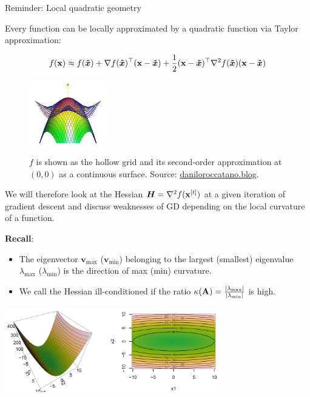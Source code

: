 \begin{vbframe}{Reminder: Local quadratic geometry}

Every function can be locally approximated by a quadratic function via Taylor approximation: 

\vspace*{-0.3cm}

$$
f(\mathbf{x}) \approx f(\bm{\tilde{x}}) + \nabla f(\bm{\tilde{x}})^\top(\mathbf{x}-\bm{\tilde{x}}) +
\frac 12(\mathbf{x}-\bm{\tilde{x}})^\top\nabla^2 f(\bm{\tilde{x}})(\mathbf{x}-\bm{\tilde{x}})
$$

\begin{figure}
	\includegraphics[width=0.3\textwidth]{figure_man/taylor_2D_quadratic.png} \\
	\begin{footnotesize} 
	$f$ is shown as the hollow grid and its second-order approximation at $(0, 0)$ as a continuous surface. Source: \url{daniloroccatano.blog}.
	\end{footnotesize}
\end{figure}

\framebreak 



We will therefore look at the Hessian $\bm{H} = \nabla^2 f(\mathbf{x}^{[t]})$ at a given iteration of gradient descent and discuss weaknesses of GD depending on the local curvature of a function. 

\vspace{0.2cm} 

\textbf{Recall}:
\begin{itemize}
	\item The eigenvector $\textbf{v}_\text{max}$ ($\textbf{v}_\text{min}$) belonging to the largest (smallest) eigenvalue $\lambda_\text{max}$ ($\lambda_\text{min}$) is the direction of max (min) curvature. 
	\item We call the Hessian ill-conditioned if the ratio $\kappa(\mathbf{A}) = \frac{|\lambda_\text{max}|}{|\lambda_\text{min}|}$ is high. 
\end{itemize}

	\begin{center}
		\includegraphics[width=0.7\textwidth]{figure_man/ill-con.png}
	\end{center}

\end{vbframe}


